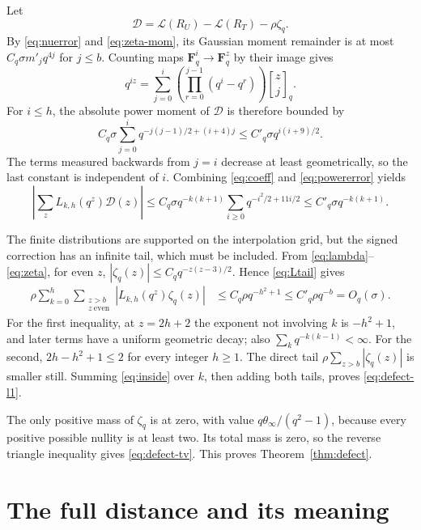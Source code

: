 \documentclass[11pt,letterpaper]{article}
\theoremstyle{remark}
\newcommand{\F}{\mathbf F}
\newcommand{\Law}{\mathcal L}
\newcommand{\qb}[2]{\genfrac{[}{]}{0pt}{}{#1}{#2}_{q}}
\begin{document}
Let
\[
 \mathcal D=\Law(R_U)-\Law(R_T)-\rho\zeta_q.
\]
By \eqref{eq:nuerror} and \eqref{eq:zeta-mom}, its Gaussian moment
remainder is at most $C_q\sigma m'_jq^{4j}$ for $j\le b$.
Counting maps $\F_q^i\to\F_q^z$ by their image gives
\begin{equation}\label{eq:power}
 q^{iz}=\sum_{j=0}^i\left(\prod_{r=0}^{j-1}(q^i-q^r)\right)\qb zj.
\end{equation}
For $i\le h$, the absolute power moment of $\mathcal D$ is therefore
bounded by
\begin{equation}\label{eq:powererror}
 C_q\sigma\sum_{j=0}^i q^{-j(j-1)/2+(i+4)j}
       \le C'_q\sigma q^{i(i+9)/2}.
\end{equation}
The terms measured backwards from $j=i$ decrease at least geometrically,
so the last constant is independent of $i$.
Combining \eqref{eq:coeff} and \eqref{eq:powererror} yields
\begin{equation}\label{eq:inside}
 \left|\sum_zL_{k,h}(q^z)\mathcal D(z)\right|
 \le C_q\sigma q^{-k(k+1)}
       \sum_{i\ge0}q^{-i^2/2+11i/2}
 \le C'_q\sigma q^{-k(k+1)}.
\end{equation}

The finite distributions are supported on the interpolation grid, but the
signed correction has an infinite tail, which must be included. From
\eqref{eq:lambda}--\eqref{eq:zeta}, for even $z$,
$|\zeta_q(z)|\le C_q q^{-z(z-3)/2}$. Hence
\eqref{eq:Ltail} gives
\begin{align*}
 \rho\sum_{k=0}^h\sum_{\substack{z>b\\z\ \mathrm{even}}}
       |L_{k,h}(q^z)\zeta_q(z)|
 &\le C_q\rho q^{-h^2+1}
 \le C'_q\rho q^{-b}=O_q(\sigma).
\end{align*}
For the first inequality, at $z=2h+2$ the exponent not involving $k$ is
$-h^2+1$, and later terms have a uniform geometric decay; also
$\sum_kq^{-k(k-1)}<\infty$.
For the second, $2h-h^2+1\le2$ for every integer $h\ge1$.
The direct tail $\rho\sum_{z>b}|\zeta_q(z)|$ is smaller still.
Summing \eqref{eq:inside} over $k$, then adding both tails, proves
\eqref{eq:defect-l1}.

The only positive mass of $\zeta_q$ is at zero, with value
$q\theta_\infty/(q^2-1)$, because every positive possible nullity is
at least two. Its total mass is zero, so the reverse triangle inequality
gives \eqref{eq:defect-tv}. This proves Theorem~\ref{thm:defect}.

\section{The full distance and its meaning}
\end{document}

